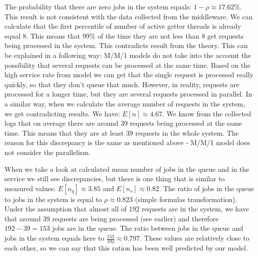 \documentclass[11pt]{article}
\begin{document}
The  probability that there are zero jobs in the system equals: $1 - \rho \approx 17.62\%$. 
This result is not consistent with the data collected from the middleware. We can calculate that the first percentile of number of active getter threads is already equal 8. This means that 99\% of the time they are not less than 8 get requests being processed in the system. This contradicts result from the theory. This can be explained in a following way: M/M/1 models do not take into the account the possibility that several requests can be processed at the same time. Based on the high service rate from model we can get that the single request is processed really quickly, so that they don't queue that much. However, in reality, requests are processed for a longer time, but they are several requests processed in parallel. In a similar way, when we calculate the average number of requests in the system, we get contradicting results. We have:
$E[n] 
\approx 4.67$.
We know from the collected logs that on average there are around 39 requests being processed at the same time. This means that they are at least 39 requests in the whole system. The reason for this discrepancy is the same as mentioned above - M/M/1 model does not consider the parallelism. 

When we take a look at calculated mean number of jobs in the queue and in the service we still see discrepancies, but there is one thing that is similar to measured values:
$E[n_q] 
\approx 3.85$ and
$E[n_s] 
\approx 0.82$.
The ratio of jobs in the queue to jobs in the system is equal to $\rho \approx 0.823$ (simple formulas transformation). Under the assumption that almost all of 192 requests are in the system, we have that around 39 requests are being processed (see earlier) and therefore $192-39 = 153$ jobs are in the queue. The ratio between jobs in the queue and jobs in the system equals here to $\frac{153}{192} \approx 0.797$. These values are relatively close to each other, so we can say that this ration has been well predicted by our model.

\end{document}
